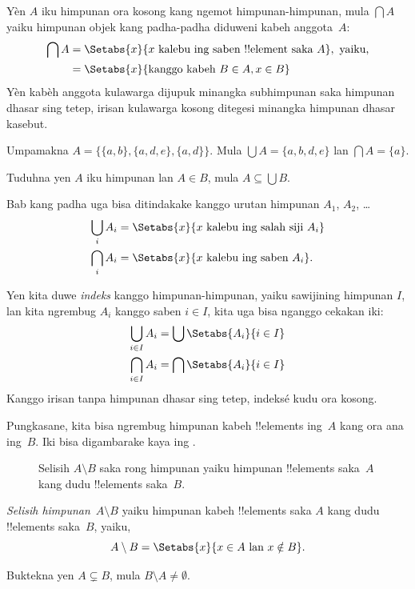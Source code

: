\documentclass[../../../include/open-logic-section]{subfiles}
\begin{document}
\begin{defn}
Yèn $A$ iku himpunan ora kosong kang ngemot himpunan-himpunan,
mula $\bigcap A$ yaiku himpunan objek kang padha-padha diduweni
kabeh anggota~$A$:
\begin{align*}
\bigcap A & = \Setabs{x}{x \text{ kalebu ing saben !!{element} saka } A},
\text{ yaiku,}\\
 & = \Setabs{x}{\text{kanggo kabeh } B \in A, x \in B}
\end{align*}
Yèn kabèh anggota kulawarga dijupuk minangka subhimpunan saka
himpunan dhasar sing tetep, irisan kulawarga kosong ditegesi
minangka himpunan dhasar kasebut.
\end{defn}

\begin{ex}
Umpamakna $A = \{ \{ a, b \}, \{ a, d, e \}, \{ a, d \} \}$.
Mula $\bigcup A = \{ a, b, d, e \}$ lan $\bigcap A = \{ a \}$.
\end{ex}
\begin{prob}
	Tuduhna yen $A$ iku himpunan lan $A \in B$, mula $A \subseteq \bigcup B$.
\end{prob}

Bab kang padha uga bisa ditindakake kanggo urutan himpunan $A_1$, $A_2$, \dots
\begin{align*}
\bigcup_i A_i & = \Setabs{x}{x \text{ kalebu ing salah siji } A_i}\\
\bigcap_i A_i & = \Setabs{x}{x \text{ kalebu ing saben } A_i}.
\end{align*}

Yen kita duwe \emph{indeks} kanggo himpunan-himpunan, yaiku sawijining
himpunan $I$, lan kita ngrembug $A_i$ kanggo saben $i \in I$,
kita uga bisa nganggo cekakan iki:
\begin{align*}
	\bigcup_{i \in I} A_i & = \bigcup \Setabs{A_i }{i \in I}\\
	\bigcap_{i \in I} A_i & = \bigcap\Setabs{A_i}{i \in I}
\end{align*}
Kanggo irisan tanpa himpunan dhasar sing tetep, indeksé kudu ora kosong.

Pungkasane, kita bisa ngrembug himpunan kabeh !!{element}s
ing~$A$ kang ora ana ing~$B$. Iki bisa digambarake kaya
ing .

\begin{figure}
  \caption{Selisih $A \setminus B$ saka rong himpunan yaiku
    himpunan !!{element}s saka~$A$ kang dudu
    !!{element}s saka~$B$.}
\end{figure}

\begin{defn}[Selisih]
\emph{Selisih himpunan}~$A \setminus B$ yaiku himpunan kabeh
!!{element}s saka $A$ kang dudu !!{element}s saka~$B$,
yaiku,
\[
A\setminus B = \Setabs{x}{x\in A \text{ lan } x \notin B}.
\]
\end{defn}

\begin{prob}
	Buktekna yen $A \subsetneq B$, mula $B \setminus A \neq \emptyset$.
\end{prob}
\end{document}
